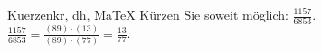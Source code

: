 \begin{MAufgabe}{Kuerzen}{kr, dh, MaTeX}
K\"urzen Sie soweit m\"oglich: $\frac{1157}{6853}$.\\ 
\ifLsg\MLoesung
\quad $\frac{1157}{6853}=\frac{(89)\cdot(13)}{(89)\cdot(77)}=\frac{13}{77}$.\else\relax\fi
 \end{MAufgabe}